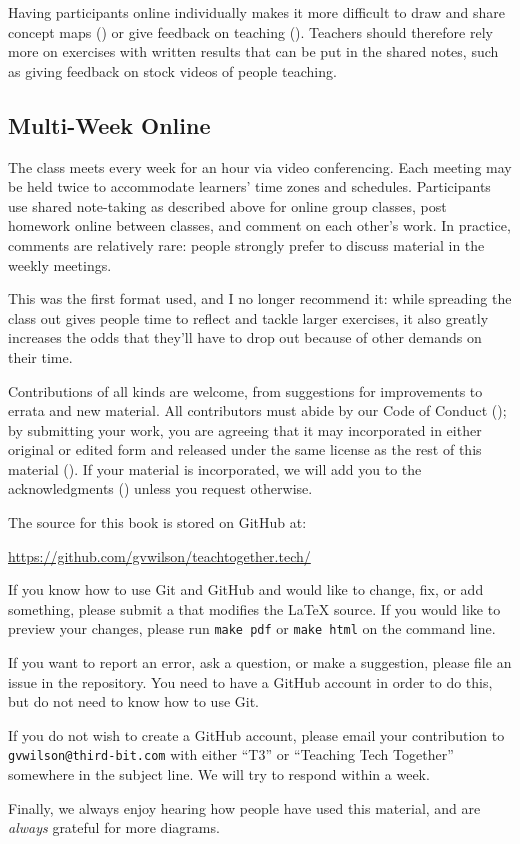 Having participants online individually makes it more difficult to draw and share concept maps ()
or give feedback on teaching ().
Teachers should therefore rely more on exercises with written results that can be put in the shared notes,
such as giving feedback on stock videos of people teaching.

\subsection*{Multi-Week Online}

The class meets every week for an hour via video conferencing.
Each meeting may be held twice to accommodate learners' time zones and schedules.
Participants use shared note-taking as described above for online group classes,
post homework online between classes,
and comment on each other's work.
In practice,
comments are relatively rare:
people strongly prefer to discuss material in the weekly meetings.

This was the first format used,
and I no longer recommend it:
while spreading the class out gives people time to reflect and tackle larger exercises,
it also greatly increases the odds that they'll have to drop out because of other demands on their time.


Contributions of all kinds are welcome,
from suggestions for improvements to errata and new material.
All contributors must abide by our Code of Conduct ();
by submitting your work,
you are agreeing that it may incorporated in either original or edited form
and released under the same license as the rest of this material ().
If your material is incorporated,
we will add you to the acknowledgments () unless you request otherwise.

The source for this book is stored on GitHub at:

\begin{center}
  \url{https://github.com/gvwilson/teachtogether.tech/}
\end{center}

\noindent
If you know how to use Git and GitHub and would like to change, fix, or add something,
please submit a  that modifies the LaTeX source.
If you would like to preview your changes,
please run \texttt{make~pdf} or \texttt{make~html} on the command line.

If you want to report an error,
ask a question,
or make a suggestion,
please file an issue in the repository.
You need to have a GitHub account in order to do this,
but do not need to know how to use Git.

If you do not wish to create a GitHub account,
please email your contribution to \texttt{gvwilson@third-bit.com}
with either ``T3'' or ``Teaching Tech Together'' somewhere in the subject line.
We will try to respond within a week.

Finally,
we always enjoy hearing how people have used this material,
and are \emph{always} grateful for more diagrams.
